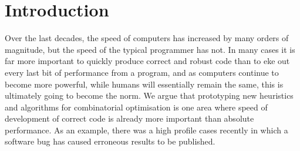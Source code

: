 \section{Introduction}


Over the last decades, the speed of computers has increased by many orders of
magnitude, but the speed of the typical programmer has not. In many cases it
is far more important to quickly produce correct and robust code than to eke
out every last bit of performance from a program, and as computers continue to
become more powerful, while humans will essentially remain the same, this is
ultimately going to become the norm. We argue that prototyping new heuristics
and algorithms for combinatorial optimisation is one area where speed of
development of correct code is already more important than absolute
performance. As an example, there was a high profile cases recently in which a
software bug has caused erroneous results to be published.

